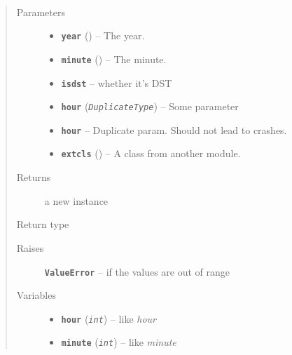 \documentclass[letterpaper,10pt,english]{sphinxmanual}
\begin{document}
\begin{fulllineitems}
\label{objects:Time}~\begin{quote}\begin{description}
\item[{Parameters}] \leavevmode\begin{itemize}
\item {} 
\textbf{\texttt{year}} ({\hyperref[objects:TimeInt]{}}) -- The year.

\item {} 
\textbf{\texttt{minute}} ({\hyperref[objects:TimeInt]{}}) -- The minute.

\item {} 
\textbf{\texttt{isdst}} -- whether it's DST

\item {} 
\textbf{\texttt{hour}} (\emph{\texttt{DuplicateType}}) -- Some parameter

\item {} 
\textbf{\texttt{hour}} -- Duplicate param.  Should not lead to crashes.

\item {} 
\textbf{\texttt{extcls}} ({\hyperref[objects:mod.Cls]{}}) -- A class from another module.

\end{itemize}

\item[{Returns}] \leavevmode
a new {\hyperref[objects:Time]{}} instance

\item[{Return type}] \leavevmode
{\hyperref[objects:Time]{}}

\item[{Raises}] \leavevmode
\textbf{\texttt{ValueError}} -- if the values are out of range

\item[{Variables}] \leavevmode\begin{itemize}
\item {} 
\textbf{\texttt{hour}} (\emph{\texttt{int}}) -- like \emph{hour}

\item {} 
\textbf{\texttt{minute}} (\emph{\texttt{int}}) -- like \emph{minute}

\end{itemize}

\end{description}\end{quote}

\end{fulllineitems}
\end{document}
